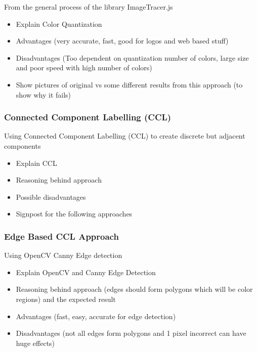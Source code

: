 \documentclass[12pt]{article}
\begin{document}
    From the general process of the library ImageTracer.js

    \begin{itemize}
        \item Explain Color Quantization
        \item Advantages (very accurate, fast, good for logos and web based stuff)
        \item Disadvantages (Too dependent on quantization number of colors, large size and poor speed with high number of colors)
        \item Show pictures of original vs some different results from this approach (to show why it fails)
    \end{itemize}

    \subsubsection{Connected Component Labelling (CCL)}

    Using Connected Component Labelling (CCL) to create discrete but adjacent components

    \begin{itemize}
        \item Explain CCL
        \item Reasoning behind approach
        \item Possible disadvantages
        \item Signpost for the following approaches
    \end{itemize}

    \subsubsection{Edge Based CCL Approach}

    Using OpenCV Canny Edge detection

    \begin{itemize}
        \item Explain OpenCV and Canny Edge Detection
        \item Reasoning behind approach (edges should form polygons which will be color regions) and the expected result
        \item Advantages (fast, easy, accurate for edge detection)
        \item Disadvantages (not all edges form polygons and 1 pixel incorrect can have huge effects)
    \end{itemize}
\end{document}
